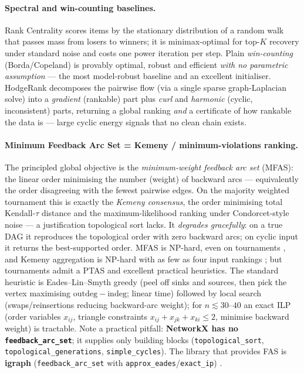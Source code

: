 \paragraph{Spectral and win-counting baselines.} Rank Centrality
\citep{ord:negahban2017rankcentrality} scores items by the stationary
distribution of a random walk that passes mass from losers to winners; it is
minimax-optimal for top-$K$ recovery under standard noise
\citep{ord:chen2019spectral} and costs one power iteration per step. Plain
\emph{win-counting} (Borda/Copeland) is provably optimal, robust and efficient
\emph{with no parametric assumption} \citep{ord:shah2017simple} --- the most
model-robust baseline and an excellent initialiser. HodgeRank
\citep{ord:jiang2011hodgerank} decomposes the pairwise flow (via a single sparse
graph-Laplacian solve) into a \emph{gradient} (rankable) part plus \emph{curl} and
\emph{harmonic} (cyclic, inconsistent) parts, returning a global ranking
\emph{and} a certificate of how rankable the data is --- large cyclic energy
signals that no clean chain exists.

\paragraph{Minimum Feedback Arc Set = Kemeny / minimum-violations ranking.} The
principled global objective is the \emph{minimum-weight feedback arc set} (MFAS):
the linear order minimising the number (weight) of backward arcs --- equivalently
the order disagreeing with the fewest pairwise edges. On the majority weighted
tournament this is exactly the \emph{Kemeny consensus}, the order minimising total
Kendall-$\tau$ distance and the maximum-likelihood ranking under Condorcet-style
noise --- a justification topological sort lacks. It \emph{degrades gracefully}:
on a true DAG it reproduces the topological order with zero backward arcs; on
cyclic input it returns the best-supported order. MFAS is NP-hard, even on
tournaments \citep{ord:karp1972,ord:alon2006ranking}, and Kemeny aggregation is
NP-hard with as few as four input rankings \citep{ord:bartholdi1989kemeny,
ord:dwork2001rank}; but tournaments admit a PTAS \citep{ord:kenyon2007fast} and
excellent practical heuristics. The standard heuristic is Eades--Lin--Smyth greedy
\citep{ord:eades1993fas} (peel off sinks and sources, then pick the vertex
maximising $\mathrm{outdeg}-\mathrm{indeg}$; linear time) followed by local search
(swaps/reinsertions reducing backward-arc weight); for $n \lesssim 30$--$40$ an
exact ILP (order variables $x_{ij}$, triangle constraints
$x_{ij}+x_{jk}+x_{ki}\le 2$, minimise backward weight) is tractable. Note a
practical pitfall: \textbf{NetworkX has no \texttt{feedback\_arc\_set}}; it
supplies only building blocks (\texttt{topological\_sort},
\texttt{topological\_generations}, \texttt{simple\_cycles}). The library that
provides FAS is \textbf{igraph} (\texttt{feedback\_arc\_set} with
\texttt{approx\_eades}/\texttt{exact\_ip}) \citep{ord:igraph}.

